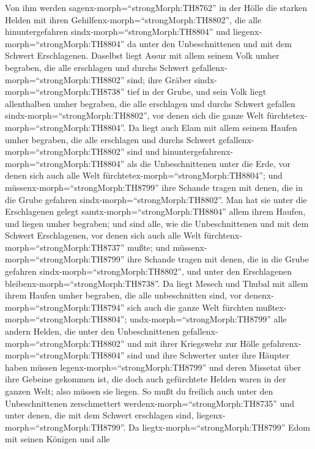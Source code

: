 Von ihm werden sagenx-morph=``strongMorph:TH8762'' in der
Hölle die starken Helden mit ihren
Gehilfenx-morph=``strongMorph:TH8802'', die alle hinuntergefahren
sindx-morph=``strongMorph:TH8804'' und
liegenx-morph=``strongMorph:TH8804'' da unter den Unbeschnittenen und
mit dem Schwert Erschlagenen.  Daselbst liegt Assur mit
allem seinem Volk umher begraben, die alle erschlagen und durchs Schwert
gefallenx-morph=``strongMorph:TH8802'' sind;  ihre Gräber
sindx-morph=``strongMorph:TH8738'' tief in der Grube, und sein Volk
liegt allenthalben umher begraben, die alle erschlagen und durchs
Schwert gefallen sindx-morph=``strongMorph:TH8802'', vor denen sich die
ganze Welt fürchtetex-morph=``strongMorph:TH8804''.  Da
liegt auch Elam mit allem seinem Haufen umher begraben, die alle
erschlagen und durchs Schwert gefallenx-morph=``strongMorph:TH8802''
sind und hinuntergefahrenx-morph=``strongMorph:TH8804'' als die
Unbeschnittenen unter die Erde, vor denen sich auch alle Welt
fürchtetex-morph=``strongMorph:TH8804''; und
müssenx-morph=``strongMorph:TH8799'' ihre Schande tragen mit denen, die
in die Grube gefahren sindx-morph=``strongMorph:TH8802''. 
Man hat sie unter die Erschlagenen gelegt
samtx-morph=``strongMorph:TH8804'' allem ihrem Haufen, und liegen umher
begraben; und sind alle, wie die Unbeschnittenen und mit dem Schwert
Erschlagenen, vor denen sich auch alle Welt
fürchtenx-morph=``strongMorph:TH8737'' mußte; und
müssenx-morph=``strongMorph:TH8799'' ihre Schande tragen mit denen, die
in die Grube gefahren sindx-morph=``strongMorph:TH8802'', und unter den
Erschlagenen bleibenx-morph=``strongMorph:TH8738''.  Da
liegt Mesech und Thubal mit allem ihrem Haufen umher begraben, die alle
unbeschnitten sind, vor denenx-morph=``strongMorph:TH8794'' sich auch
die ganze Welt fürchten mußtex-morph=``strongMorph:TH8804'';
 undx-morph=``strongMorph:TH8799'' alle andern Helden, die
unter den Unbeschnittenen gefallenx-morph=``strongMorph:TH8802'' und mit
ihrer Kriegswehr zur Hölle gefahrenx-morph=``strongMorph:TH8804'' sind
und ihre Schwerter unter ihre Häupter haben müssen
legenx-morph=``strongMorph:TH8799'' und deren Missetat über ihre Gebeine
gekommen ist, die doch auch gefürchtete Helden waren in der ganzen Welt;
also müssen sie liegen.  So mußt du freilich auch unter den
Unbeschnittenen zerschmettert werdenx-morph=``strongMorph:TH8735'' und
unter denen, die mit dem Schwert erschlagen sind,
liegenx-morph=``strongMorph:TH8799''.  Da
liegtx-morph=``strongMorph:TH8799'' Edom mit seinen Königen und alle
